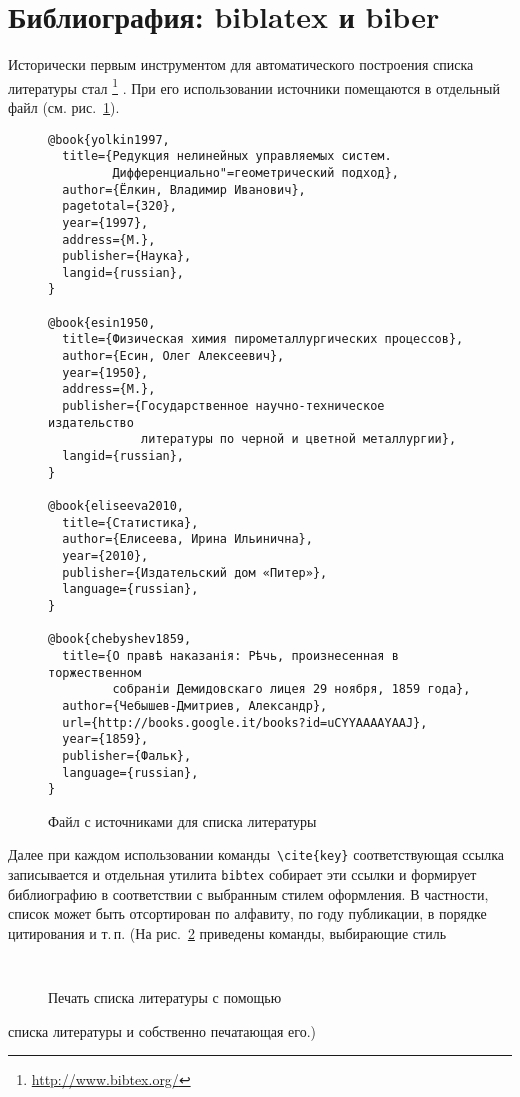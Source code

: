 \documentclass[a4paper,12pt]{article}
\let\orighref=\href
\renewcommand\href[2]{%
  \orighref{#1}{#2}\footnote{\url{#1}}%
}
\begin{document}
\section{Библиография: biblatex и biber}
Исторически первым инструментом для автоматического построения
списка литературы стал \href{http://www.bibtex.org/}{\BibTeX}. При его
использовании источники
помещаются в отдельный файл (см. рис.~\ref{bibfile}).
\begin{figure}[tp]
\footnotesize
\begin{verbatim}
@book{yolkin1997,
  title={Редукция нелинейных управляемых систем.
         Дифференциально"=геометрический подход},
  author={Ёлкин, Владимир Иванович},
  pagetotal={320},
  year={1997},
  address={M.},
  publisher={Наука},
  langid={russian},
}

@book{esin1950,
  title={Физическая химия пирометаллургических процессов},
  author={Есин, Олег Алексеевич},
  year={1950},
  address={M.},
  publisher={Государственное научно-техническое издательство
             литературы по черной и цветной металлургии},
  langid={russian},
}

@book{eliseeva2010,
  title={Статистика},
  author={Елисеева, Ирина Ильинична},
  year={2010},
  publisher={Издательский дом «Питер»},
  language={russian},
}

@book{chebyshev1859,
  title={О правѣ наказанія: Рѣчь, произнесенная в торжественном
         собраніи Демидовскаго лицея 29 ноября, 1859 года},
  author={Чебышев-Дмитриев, Александр},
  url={http://books.google.it/books?id=uCYYAAAAYAAJ},
  year={1859},
  publisher={Фальк},
  language={russian},
}
\end{verbatim}
\caption{Файл с источниками для списка литературы}\label{bibfile}
\end{figure}
Далее при каждом использовании команды~\verb|\cite{key}| соответствующая
ссылка записывается и отдельная утилита \texttt{bibtex} собирает эти
ссылки и формирует библиографию в соответствии с выбранным стилем оформления.
В частности, список может быть отсортирован по алфавиту, по году
публикации, в порядке цитирования и т.\,п.
(На рис.~\ref{bibliography} приведены команды, выбирающие стиль
\begin{figure}[tp]
\footnotesize
\begin{verbatim}


\end{verbatim}
\caption{Печать списка литературы с помощью \BibTeX}\label{bibliography}
\end{figure}
списка литературы и собственно печатающая его.)
\end{document}
